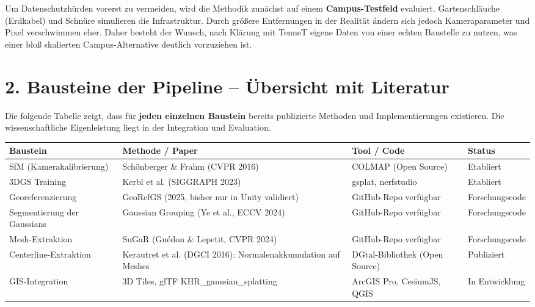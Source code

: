 \documentclass[11pt, a4paper]{article}
\begin{document}
Um Datenschutzhürden vorerst zu vermeiden, wird die Methodik zunächst auf einem \textbf{Campus-Testfeld} evaluiert. Gartenschläuche (Erdkabel) und Schnüre simulieren die Infrastruktur. Durch größere Entfernungen in der Realität ändern sich jedoch Kameraparameter und Pixel verschwimmen eher. Daher besteht der Wunsch, nach Klärung mit TenneT eigene Daten von einer echten Baustelle zu nutzen, was einer bloß skalierten Campus-Alternative deutlich vorzuziehen ist.

\section*{2. Bausteine der Pipeline -- Übersicht mit Literatur}

Die folgende Tabelle zeigt, dass für \textbf{jeden einzelnen Baustein} bereits publizierte Methoden und Implementierungen existieren. Die wissenschaftliche Eigenleistung liegt in der Integration und Evaluation.

\begin{center}
\small
\begin{tabular}{|p{3.2cm}|p{4.5cm}|p{4cm}|p{2.5cm}|}
\hline
\textbf{Baustein} & \textbf{Methode / Paper} & \textbf{Tool / Code} & \textbf{Status} \\
\hline
SfM (Kamera\-kalibrierung) & Schönberger \& Frahm (CVPR 2016) & COLMAP (Open Source) & Etabliert \\
\hline
3DGS Training & Kerbl et al. (SIGGRAPH 2023) & gsplat, nerfstudio & Etabliert \\
\hline
Georeferenzierung & GeoRefGS (2025, bisher nur in Unity validiert) & GitHub-Repo verfügbar & Forschungscode \\
\hline
Segmentierung der Gaussians & Gaussian Grouping (Ye et al., ECCV 2024) & GitHub-Repo verfügbar & Forschungscode \\
\hline
Mesh-Extraktion & SuGaR (Guédon \& Lepetit, CVPR 2024) & GitHub-Repo verfügbar & Forschungscode \\
\hline
Centerline-Extraktion & Kerautret et al. (DGCI 2016): Normalenakkumulation auf Meshes & DGtal-Bibliothek (Open Source) & Publiziert \\
\hline
GIS-Integration & 3D Tiles, glTF KHR\_gaussian\_splatting & ArcGIS Pro, CesiumJS, QGIS & In Entwicklung \\
\hline
\end{tabular}
\end{center}
\end{document}
